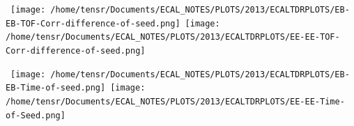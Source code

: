 \vspace{5mm}
\begin{minipage}{0.94\textwidth} 
\begin{center}
\mbox{
\texttt{[image: /home/tensr/Documents/ECAL\_NOTES/PLOTS/2013/ECALTDRPLOTS/EB-EB-TOF-Corr-difference-of-seed.png]}\quad
\texttt{[image: /home/tensr/Documents/ECAL\_NOTES/PLOTS/2013/ECALTDRPLOTS/EE-EE-TOF-Corr-difference-of-seed.png]}}
\label{fig:ZeeTimePerformance2}
\end{center}
\end{minipage}

\vspace{5mm}
\begin{minipage}{0.94\textwidth} 
\begin{center}
\mbox{
\texttt{[image: /home/tensr/Documents/ECAL\_NOTES/PLOTS/2013/ECALTDRPLOTS/EB-EB-Time-of-seed.png]}\quad
\texttt{[image: /home/tensr/Documents/ECAL\_NOTES/PLOTS/2013/ECALTDRPLOTS/EE-EE-Time-of-Seed.png]}}
\label{fig:ZeeTimePerformance1}
\end{center}
\end{minipage}

